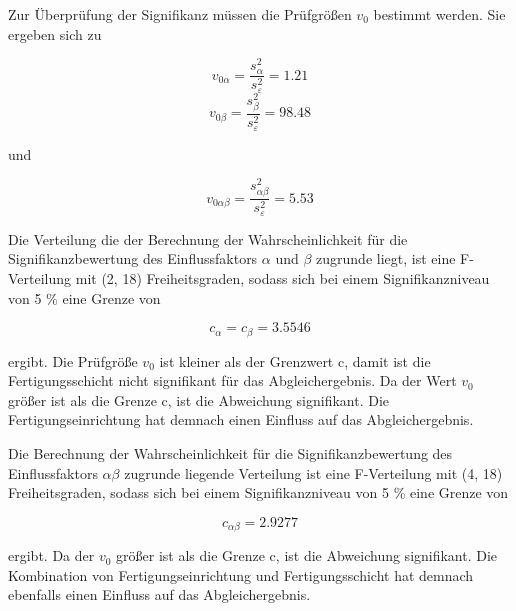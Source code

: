 \noindent Zur \"{U}berpr\"{u}fung der Signifikanz m\"{u}ssen die Pr\"{u}fgr\"{o}{\ss}en $v_{0}$ bestimmt werden. Sie ergeben sich zu

\begin{equation}\label{eq:ninefiftythree}
v_{0\alpha} =\dfrac{s_{\alpha}^{2}}{s_{\varepsilon}^{2}} = 1.21
\end{equation}
\begin{equation}\label{eq:ninefiftyfour}
v_{0\beta} =\dfrac{s_{\beta}^{2}}{s_{\varepsilon}^{2}} =98.48
\end{equation}

\noindent und

\begin{equation}\label{eq:ninefiftyfive}
v_{0\alpha \beta} =\dfrac{s_{\alpha \beta}^{2}}{s_{\varepsilon}^{2}} =5.53
\end{equation}

\noindent Die Verteilung die der Berechnung der Wahrscheinlichkeit f\"{u}r die Signifikanzbewertung des Einflussfaktors $\alpha$ und $\beta$ zugrunde liegt, ist eine F-Verteilung mit (2, 18) Freiheitsgraden, sodass sich bei einem Signifikanzniveau von 5 \% eine Grenze von 

\begin{equation}\label{eq:ninefiftysix}
c_{\alpha} =c_{\beta} = 3.5546
\end{equation}

\noindent ergibt. Die Pr\"{u}fgr\"{o}{\ss}e $v_{0}$ ist kleiner als der Grenzwert c, damit ist die Fertigungsschicht nicht signifikant f\"{u}r das Abgleichergebnis. Da der Wert $v_{0}$ gr\"{o}{\ss}er ist als die Grenze c, ist die Abweichung signifikant. Die Fertigungseinrichtung hat demnach einen Einfluss auf das Abgleichergebnis. \newline

\noindent Die Berechnung der Wahrscheinlichkeit f\"{u}r die Signifikanzbewertung des Einflussfaktors $\alpha\beta$ zugrunde liegende Verteilung ist eine F-Verteilung mit (4, 18) Freiheitsgraden, sodass sich bei einem Signifikanzniveau von 5 \% eine Grenze von 

\begin{equation}\label{eq:ninefiftyseven}
c_{\alpha \beta} =2.9277
\end{equation}

\noindent ergibt. Da der $v_{0}$ gr\"{o}{\ss}er ist als die Grenze c, ist die Abweichung signifikant. Die Kombination von Fertigungseinrichtung und Fertigungsschicht hat demnach ebenfalls einen Einfluss auf das Abgleichergebnis.\newline

